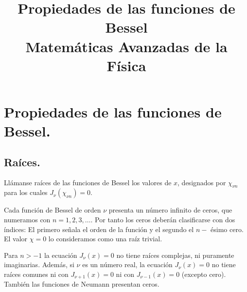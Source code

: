 
\title{{Propiedades de las funciones de Bessel} \\ {\large Matemáticas Avanzadas de la Física}}
\date{ }

\fontsize{14}{14}\selectfont
\section{Propiedades de las funciones de Bessel.}
\subsection{Raíces.}
Llámanse raíces de las funciones de Bessel los valores de $x$, designados por $\chi_{\nu n}$ para los cuales $J_{\nu} (\chi_{\nu n}) = 0$. 
\par
Cada función de Bessel de orden $\nu$ presenta un número infinito de ceros, que numeramos con $n = 1, 2, 3, \ldots$. Por tanto los ceros deberán clasificarse con dos índices: El primero señala el orden de la función y el segundo el $n-$ ésimo cero. El valor $\chi = 0$ lo consideramos como una raíz trivial.
\par
Para $n > -1$ la ecuación $J_{\nu} (x) = 0$ no tiene raíces complejas, ni puramente imaginarias. Además, si $\nu$ es un número real, la ecuación $J_{\nu} (x) = 0$ no tiene raíces comunes ni con $J_{\nu+1} (x) = 0$ ni con $J_{\nu-1} (x) = 0$ (excepto cero). También las funciones de Neumann presentan ceros.
